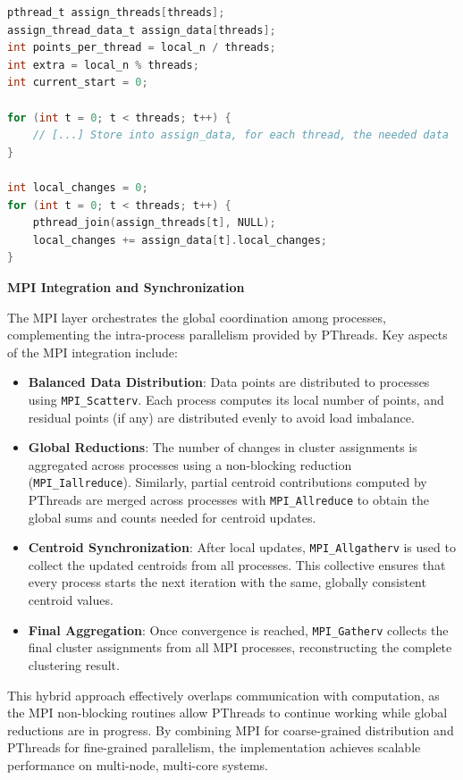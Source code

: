 \documentclass[11pt, journal]{IEEEtran}
\begin{document}
\begin{lstlisting}[language = C]
pthread_t assign_threads[threads];
assign_thread_data_t assign_data[threads];
int points_per_thread = local_n / threads;
int extra = local_n % threads;
int current_start = 0;

for (int t = 0; t < threads; t++) {
    // [...] Store into assign_data, for each thread, the needed data
}

int local_changes = 0;
for (int t = 0; t < threads; t++) {
    pthread_join(assign_threads[t], NULL);
    local_changes += assign_data[t].local_changes;
}
\end{lstlisting}

\noindent \textbf{MPI Integration and Synchronization}

The MPI layer orchestrates the global coordination among processes, complementing the intra-process parallelism provided by PThreads. Key aspects of the MPI integration include:

\begin{itemize}
    \item \textbf{Balanced Data Distribution}: Data points are distributed to processes using \texttt{MPI\_Scatterv}. Each process computes its local number of points, and residual points (if any) are distributed evenly to avoid load imbalance.
    
    \item \textbf{Global Reductions}: The number of changes in cluster assignments is aggregated across processes using a non-blocking reduction (\texttt{MPI\_Iallreduce}). Similarly, partial centroid contributions computed by PThreads are merged across processes with \texttt{MPI\_Allreduce} to obtain the global sums and counts needed for centroid updates.
    
    \item \textbf{Centroid Synchronization}: After local updates, \texttt{MPI\_Allgatherv} is used to collect the updated centroids from all processes. This collective ensures that every process starts the next iteration with the same, globally consistent centroid values.
    
    \item \textbf{Final Aggregation}: Once convergence is reached, \texttt{MPI\_Gatherv} collects the final cluster assignments from all MPI processes, reconstructing the complete clustering result.
\end{itemize}

This hybrid approach effectively overlaps communication with computation, as the MPI non-blocking routines allow PThreads to continue working while global reductions are in progress. By combining MPI for coarse-grained distribution and PThreads for fine-grained parallelism, the implementation achieves scalable performance on multi-node, multi-core systems.
\end{document}
